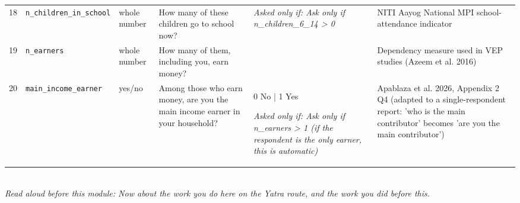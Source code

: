 \documentclass[9pt,a4paper,landscape]{article}
\begin{document}
\begin{longtable}{@{}p{0.5cm}p{3.3cm}p{1.7cm}p{7.3cm}p{5.6cm}p{5.4cm}@{}}
\footnotesize 18 & \footnotesize\texttt{n\_children\_in\_school} & \scriptsize whole number & \footnotesize How many of these children go to school now?\par\vspace{1pt}{\footnotesize\color{hdr}{\hifont इनमें से कितने बच्चे अभी स्कूल जाते हैं?}} & \scriptsize \textit{Asked only if: Ask only if n\_children\_6\_14 > 0} & \scriptsize NITI Aayog National MPI school-attendance indicator\\
\footnotesize 19 & \footnotesize\texttt{n\_earners} & \scriptsize whole number & \footnotesize How many of them, including you, earn money?\par\vspace{1pt}{\footnotesize\color{hdr}{\hifont इनमें से कितने लोग, आपको मिलाकर, पैसा कमाते हैं?}} & \scriptsize  & \scriptsize Dependency measure used in VEP studies (Azeem et al. 2016)\\
\footnotesize 20 & \footnotesize\texttt{main\_income\_earner} & \scriptsize yes/no & \footnotesize Among those who earn money, are you the main income earner in your household?\par\vspace{1pt}{\footnotesize\color{hdr}{\hifont जो लोग कमाते हैं, उनमें सबसे ज़्यादा कमाने वाले आप ही हैं?}} & \scriptsize 0 No | 1 Yes\par\vspace{1pt}\textit{Asked only if: Ask only if n\_earners > 1 (if the respondent is the only earner, this is automatic)} & \scriptsize Apablaza et al. 2026, Appendix 2 Q4 (adapted to a single-respondent report: 'who is the main contributor' becomes 'are you the main contributor')\\
\bottomrule\end{longtable}\vspace{6pt}
\\[3pt]
{\small\itshape Read aloud before this module: Now about the work you do here on the Yatra route, and the work you did before this.}\\[5pt]
\end{document}

